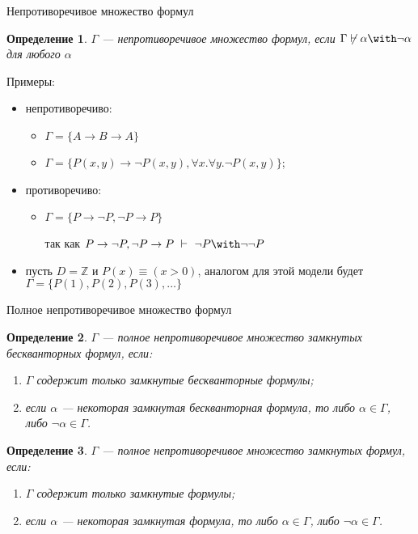 \documentclass[aspectratio=169]{beamer}
\newtheorem{dfn}{Определение}[section]
\begin{document}
\begin{frame}{Непротиворечивое множество формул}
\begin{dfn}$\Gamma$ --- \emph{непротиворечивое множество формул},
если $\Gamma\not\vdash\alpha\with\neg\alpha$ для любого $\alpha$
\end{dfn}\pause

Примеры:
\begin{itemize}
\item непротиворечиво: \begin{itemize}
\item $\Gamma = \{A \rightarrow B \rightarrow A\}$\pause
\item $\Gamma = \{P(x,y)\rightarrow\neg P(x,y), \forall x.\forall y.\neg P(x,y)\}$;
\end{itemize}\pause
\item противоречиво: \begin{itemize}
\item $\Gamma = \{P\rightarrow\neg P, \neg P \rightarrow P\}$

так как
$P\rightarrow\neg P, \neg P \rightarrow P \ \vdash\  \neg P \with \neg\neg P$\pause
\end{itemize}
\item пусть $D = \mathbb{Z}$ и $P(x) \equiv (x > 0)$, аналогом для этой модели
будет $\Gamma = \{P(1), P(2), P(3), \dots\}$
\end{itemize}
\end{frame}

\begin{frame}{Полное непротиворечивое множество формул}
\begin{dfn}$\Gamma$ --- \emph{полное} непротиворечивое множество замкнутых бескванторных формул,
если:
\begin{enumerate}\item $\Gamma$ содержит только замкнутые бескванторные формулы;
\item если $\alpha$ --- некоторая замкнутая бескванторная формула, то либо $\alpha\in\Gamma$, либо $\neg\alpha\in\Gamma$.
\end{enumerate}
\end{dfn}\pause

\begin{dfn}$\Gamma$ --- \emph{полное} непротиворечивое множество замкнутых формул, если:
\begin{enumerate}\item $\Gamma$ содержит только замкнутые формулы;
\item если $\alpha$ --- некоторая замкнутая формула, то либо $\alpha \in \Gamma$, либо $\neg\alpha \in \Gamma$.
\end{enumerate}
\end{dfn}
\end{frame}
\end{document}
